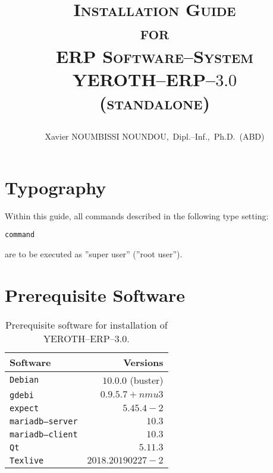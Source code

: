 \documentclass[a4paper, 10pt]{article}
\newcommand{\texlive}{\texttt{Texlive}\xspace}
\newcommand{\gdebi}{\texttt{gdebi}\xspace}
\newcommand{\expect}{\texttt{expect}\xspace}
\newcommand{\debian}{\texttt{Debian}\xspace}
\newcommand{\qt}{\texttt{Qt}\xspace}
\newcommand{\mariadbserver}{\texttt{mariadb--server}\xspace}
\newcommand{\mariadbclient}{\texttt{mariadb--client}\xspace}
\newcommand{\yerotherptroiszero}{\textcolor{yerenColorBlue}{\sc YEROTH--ERP--$3.0$}\xspace}
\newcommand{\yerotherp}{\textcolor{yerenColorBlue}{\sc YEROTH--ERP--$3.0$}\xspace}
\newcommand{\erp}{ERP Software--System\xspace}
\newcommand{\myfullacademicname}{Xavier NOUMBISSI NOUNDOU,~Dipl.--Inf.,~Ph.D.~(ABD)\xspace}
\newcommand{\rootcommand}[1]{
\begin{center}
\textcolor{purplish}{#1\xspace}
\end{center}}
\begin{document}

\title{
\vspace{-1.65em}
\textcolor{medgreen}{\textsc{Installation Guide\\
										for \\
									 \erp \\ \vspace{1em}
									 \yerotherp \\ 
									 \hspace{0.6em} \textcolor{yerenColorBlue}{(standalone)} }}
									 \author{\myfullacademicname}
}

\date{} 
\maketitle
\thispagestyle{fancy}

\vspace{-0.5em}

{}
\begingroup
\tableofcontents
\endgroup

\vspace{0.25cm}

\section{Typography}

Within this guide, all commands described
in the following type setting:
	\begin{alltt}
		\rootcommand{command}
	\end{alltt}
are to be executed as ''super user'' (''root user'').

\section{Prerequisite Software}

\begin{table}[!htbp]
\centering
\begin{tabular}{l|r}
\textbf{Software}	&
\textbf{Versions}	\\ \hline
\debian				&
$10.0.0$ (buster)	\\ \hline
\gdebi				&
$0.9.5.7+nmu3$		\\ \hline
\expect				&
$5.45.4-2$			\\ \hline
\mariadbserver		&
$10.3$				\\ \hline
\mariadbclient		&
$10.3$				\\ \hline
\qt					&
$5.11.3$			\\ \hline	
\texlive			&
$2018.20190227-2$	\\
\end{tabular}
\caption{Prerequisite software for installation of \yerotherptroiszero.}
\label{tab:prerequisite-software}
\end{table}
\end{document}
